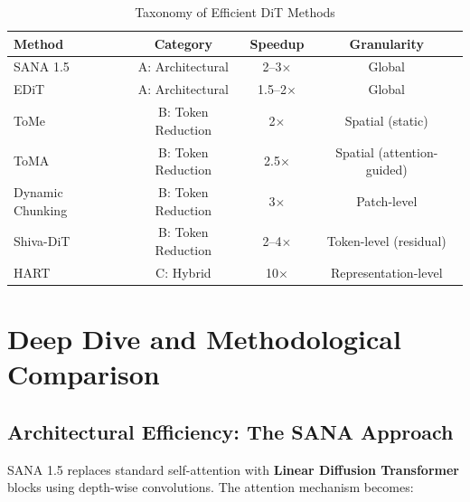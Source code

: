\documentclass{article}
\begin{document}
\begin{table}[h]
    \centering
    \caption{Taxonomy of Efficient DiT Methods}
    \label{tab:taxonomy}
    \begin{tabular}{@{}lccc@{}}
        \toprule
        \textbf{Method}  & \textbf{Category}  & \textbf{Speedup} & \textbf{Granularity}       \\
        \midrule
        SANA 1.5         & A: Architectural   & 2--3$\times$     & Global                     \\
        EDiT             & A: Architectural   & 1.5--2$\times$   & Global                     \\
        ToMe             & B: Token Reduction & 2$\times$        & Spatial (static)           \\
        ToMA             & B: Token Reduction & 2.5$\times$      & Spatial (attention-guided) \\
        Dynamic Chunking & B: Token Reduction & 3$\times$        & Patch-level                \\
        Shiva-DiT        & B: Token Reduction & 2--4$\times$     & Token-level (residual)     \\
        HART             & C: Hybrid          & 10$\times$       & Representation-level       \\
        \bottomrule
    \end{tabular}
\end{table}

\section{Deep Dive and Methodological Comparison}

\subsection{Architectural Efficiency: The SANA Approach}

SANA 1.5 \cite{xie2025sana} replaces standard self-attention with
\textbf{Linear Diffusion Transformer} blocks using depth-wise convolutions.
The attention mechanism becomes:

\end{document}
